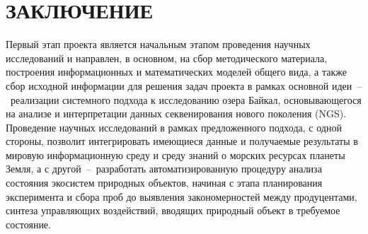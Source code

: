 \documentclass[a4paper,12pt,openany,final]{extreport}
\begin{document}
\chapter*{ЗАКЛЮЧЕНИЕ}
\label{chap:concl}


Первый этап проекта является начальным этапом проведения научных исследований и направлен, в основном, на сбор методического материала, построения информационных и математических моделей общего вида, а также сбор исходной информации для решения задач проекта в рамках основной идеи~--~реализации системного подхода к исследованию озера Байкал, основывающегося на анализе и интерпретации данных секвенирования нового поколения (NGS).  Проведение научных исследований в рамках предложенного подхода, с одной стороны, позволит интегрировать имеющиеся данные и получаемые результаты в мировую информационную среду и среду знаний о морских ресурсах планеты Земля, а с другой~--~разработать автоматизированную процедуру анализа состояния экосистем природных объектов, начиная с этапа планирования эксперимента и сбора проб до выявления закономерностей между продуцентами, синтеза управляющих воздействий, вводящих природный объект в требуемое состояние.
\end{document}
